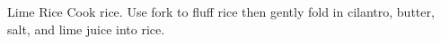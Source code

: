 \documentclass[../main.tex]{subfiles}
\begin{document}
\begin{recipe}{Lime Rice}{}{}
    Cook rice.
    Use fork to fluff rice then gently fold in cilantro,
    butter, salt, and lime juice into rice.
\end{recipe}
\end{document}
